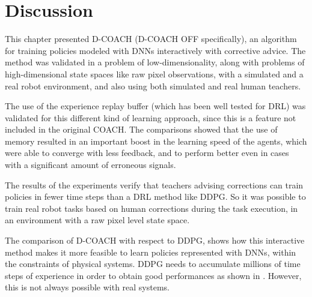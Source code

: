 \vspace{1cm}

\section{Discussion}
This chapter presented D-COACH (D-COACH OFF specifically), an algorithm for training policies modeled with DNNs interactively with corrective advice. The method was validated in a problem of low-dimensionality, along with problems of high-dimensional state spaces like raw pixel observations, with a simulated and a real robot environment, and also using both simulated and real human teachers. 

The use of the experience replay buffer (which has been well tested for DRL) was validated for this different kind of learning approach, since this is a feature not included in the original COACH. The comparisons showed that the use of memory resulted in an important boost in the learning speed of the agents, which were able to converge with less feedback, and to perform better even in cases with a significant amount of erroneous signals.  

The results of the experiments verify that teachers advising corrections can train policies in fewer time steps than a DRL method like DDPG. So it was possible to train real robot tasks based on human corrections during the task execution, in an environment with a raw pixel level state space. 

The comparison of D-COACH with respect to DDPG, shows how this interactive method makes it more feasible to learn policies represented with DNNs, within the constraints of physical systems. DDPG needs to accumulate millions of time steps of experience in order to obtain good performances as shown in \cite{Lillicrap2015}. However, this is not always possible with real systems.
